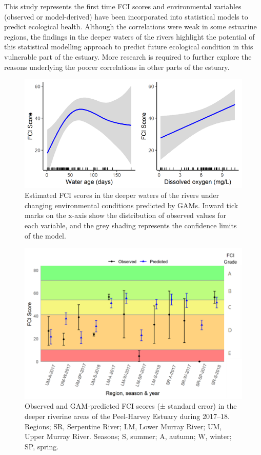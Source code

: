 \documentclass[
]{book}
\begin{document}
This study represents the first time FCI scores and environmental variables (observed or model-derived) have been incorporated into statistical models to predict ecological health. Although the correlations were weak in some estuarine regions, the findings in the deeper waters of the rivers highlight the potential of this statistical modelling approach to predict future ecological condition in this vulnerable part of the estuary. More research is required to further explore the reasons underlying the poorer correlations in other parts of the estuary.

\begin{figure}
\includegraphics[width=1\linewidth]{images/fish_ecology/picture16} \caption{Estimated FCI scores in the deeper waters of the rivers under changing environmental conditions predicted by GAMs. Inward tick marks on the x-axis show the distribution of observed values for each variable, and the grey shading represents the confidence limits of the model.}\label{fig:fish-ecology-pic16}
\end{figure}

\begin{figure}
\includegraphics[width=1\linewidth]{images/fish_ecology/picture17} \caption{Observed and GAM-predicted FCI scores (± standard error) in the deeper riverine areas of the Peel-Harvey Estuary during 2017–18. Regions; SR, Serpentine River; LM, Lower Murray River; UM, Upper Murray River. Seasons; S, summer; A, autumn; W, winter; SP, spring.}\label{fig:fish-ecology-pic17}
\end{figure}
\end{document}

